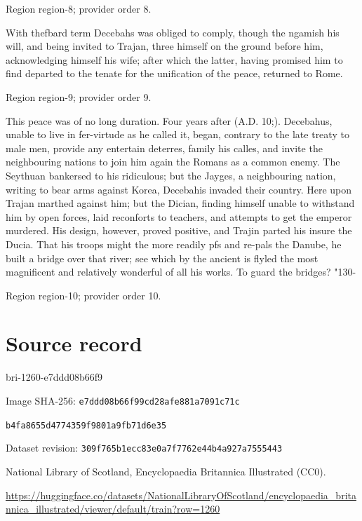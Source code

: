 \documentclass[11pt]{article}
\begin{document}
{\scriptsize\color{gray} Region region-8; provider order 8.\par}
\medskip

With thefbard term Decebahs was obliged to comply, though the ngamish his will, and being invited to Trajan, three himself on the ground before him, acknowledging himself his wife; after which the latter, having promised him to find departed to the tenate for the unification of the peace, returned to Rome.
\par

{\scriptsize\color{gray} Region region-9; provider order 9.\par}
\medskip

This peace was of no long duration. Four years after (A.D. 10;). Decebahus, unable to live in fer-virtude as he called it, began, contrary to the late treaty to male men, provide any entertain deterres, family his calles, and invite the neighbouring nations to join him again the Romans as a common enemy. The Seythuan bankersed to his ridiculous; but the Jayges, a neighbouring nation, writing to bear arms against Korea, Decebahis invaded their country. Here upon Trajan marthed against him; but the Dician, finding himself unable to withstand him by open forces, laid reconforts to teachers, and attempts to get the emperor murdered. His design, however, proved positive, and Trajin parted his insure the Ducia. That his troops might the more readily pfs and re-pals the Danube, he built a bridge over that river; see which by the ancient is flyled the most magnificent and relatively wonderful of all his works. To guard the bridges? "130-
\par

{\scriptsize\color{gray} Region region-10; provider order 10.\par}
\medskip
\newpage\section*{Source record}
bri-1260-e7ddd08b66f9\par
Image SHA-256: \texttt{e7ddd08b66f99cd28afe881a7091c71c}\par\texttt{b4fa8655d4774359f9801a9fb71d6e35}\par
Dataset revision: \texttt{309f765b1ecc83e0a7f7}\texttt{762e44b4a927a7555443}\par
National Library of Scotland, Encyclopaedia Britannica Illustrated (CC0).\par
\url{https://huggingface.co/datasets/NationalLibraryOfScotland/encyclopaedia_britannica_illustrated/viewer/default/train?row=1260}
\end{document}
